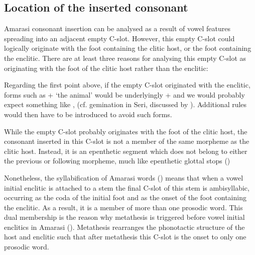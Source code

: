 \subsection{Location of the inserted consonant}\label{sec:LocInsCon}
Amarasi consonant insertion can be analysed as a result of
vowel features spreading into an adjacent empty C-slot.
However, this empty C-slot could logically originate with the foot containing the clitic host,
or the foot containing the enclitic.
There are at least three reasons for analysing this empty C-slot
as originating with the foot of the clitic host rather than the enclitic:

\begin{exe}
\end{exe}

Regarding the first point above, if the empty C-slot originated with the enclitic, forms such as
+ `the animal' {\ra}  would be underlyingly
+ and we would probably expect something like ,
(cf. gemination in Seri, discussed by \citealt[631]{mast83}).
Additional rules would then have to be introduced to avoid such forms.

While the empty C-slot probably originates with the foot of the clitic host,
the consonant inserted in this C-slot
is not a member of the same morpheme as the clitic host.
Instead, it is an epenthetic segment which does not
belong to either the previous or following morpheme,
much like epenthetic glottal stops ()

Nonetheless, the syllabification of Amarasi words ()
means that when a vowel initial enclitic is attached to a stem
the final C-slot of this stem is ambisyllabic,
occurring as the coda of the initial foot
and as the onset of the foot containing the enclitic.
As a result, it is a member of more than one prosodic word.
This dual membership is the reason why metathesis
is triggered before vowel initial enclitics in Amarasi ().
Metathesis rearranges the phonotactic structure
of the host and enclitic such that after
metathesis this C-slot is the onset to only one prosodic word.
